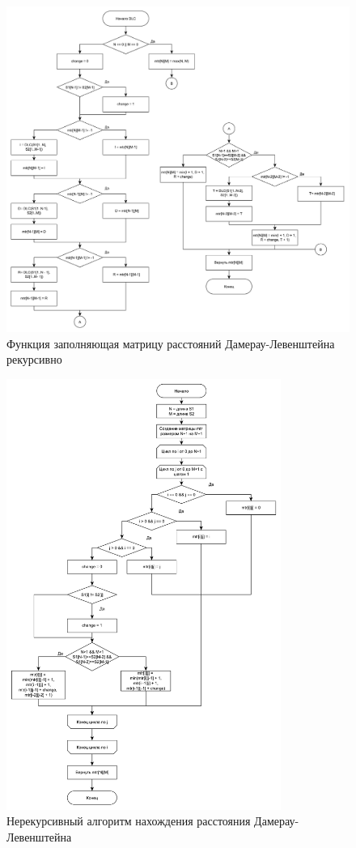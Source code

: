 \begin{figure}
	\centering
	\includegraphics[width=1\textwidth]{img/DLrecCash2_1.pdf} %
	\caption{Функция заполняющая матрицу расстояний Дамерау-Левенштейна рекурсивно}
	\label{fig:DLrecCash2}
\end{figure}

\begin{figure}
	\centering
	\includegraphics[width=0.8\textwidth]{img/DLiter.pdf} %
	\caption{Нерекурсивный алгоритм нахождения расстояния Дамерау-Левенштейна}
	\label{fig:DLiter}
\end{figure}

